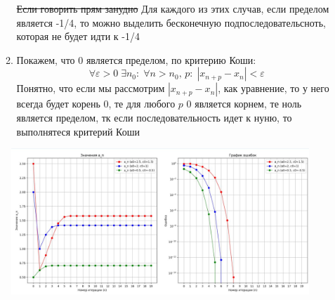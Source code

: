 \documentclass{report}
\begin{document}
\begin{enumerate}
\begin{enumerate}
        \sout{Если говорить прям занудно} Для каждого из этих случав, если пределом является -1/4, то можно выделить бесконечную подпоследовательсноть, которая не будет идти к -1/4
    \item 
        Покажем, что 0 является пределом, по критерию Коши:
        \[
            \forall \varepsilon > 0 \; \exists n_0: \; \forall n > n_0, \, p: \; |x_{n+p} - x_n| < \varepsilon
        \]
        Понятно, что если мы рассмотрим $|x_{n+p} - x_n|$, как уравнение, то у него всегда будет корень 0, те для любого $p$ 0 является корнем, те ноль является пределом, тк если последовательность идет к нуню, то выполнятеся критерий Коши

\end{enumerate}
\end{enumerate}
\begin{figure}[H]
\begin{center}

\includegraphics[scale=0.5]{21.png}
\end{center}
\end{figure}
\end{document}

